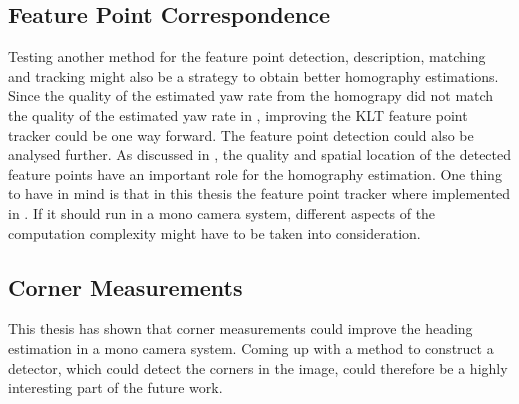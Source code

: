 \subsection{Feature Point Correspondence}
Testing another method for the feature point detection, description, matching and tracking might also be a strategy to obtain better homography estimations.
Since the quality of the estimated yaw rate from the homograpy did not match the quality of the estimated yaw rate in \cite{Gabb:2013}, improving the KLT feature point tracker could be one way forward.
The feature point detection could also be analysed further.
As discussed in , the quality and spatial location of the detected feature points have an important role for the homography estimation.
One thing to have in mind is that in this thesis the feature point tracker where implemented in \matlab.
If it should run in a mono camera system, different aspects of the computation complexity might have to be taken into consideration.

\subsection{Corner Measurements}
This thesis has shown that corner measurements could improve the heading estimation in a mono camera system.
Coming up with a method to construct a detector, which could detect the corners in the image, could therefore be a highly interesting part of the future work.